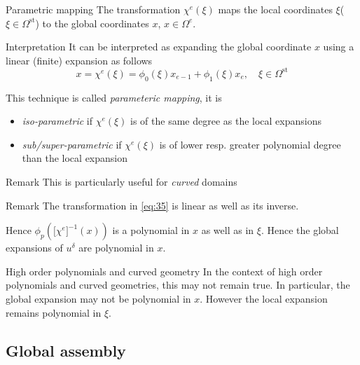 \begin{frame}{Parametric mapping}
  The transformation $\chi^e(\xi)$ maps the local coordinates
  $\xi$($\xi \in \Omega^{\text{st}}$) to the global coordinates $x$,
  $x \in \Omega^e$.
  
  \begin{block}{Interpretation}
    It can be interpreted as expanding the global coordinate $x$ using a linear (finite) expansion as follows
    \begin{equation}
      \label{eq:35}
      x = \chi^e(\xi) = \phi_0(\xi) x_{e-1} + \phi_1(\xi) x_e, \quad \xi \in \Omega^{\text{st}}
    \end{equation}
  \end{block}
  
  This technique is called \emph{parameteric mapping}, it is
  \begin{itemize}
  \item \emph{iso-parametric} if $\chi^e(\xi)$ is of the same degree as the local expansions
  \item \emph{sub/super-parametric} if $\chi^e(\xi)$ is of lower resp. greater polynomial degree than the local expansion
  \end{itemize}
  \begin{block}{Remark}
    This is particularly useful for \emph{curved} domains
  \end{block}
\end{frame}
\begin{frame}{Remark}
  The transformation in \eqref{eq:35} is linear as well as its inverse. 
  
  Hence $\phi_p(\Big[\chi^e\Big]^{-1} (x))$ is a polynomial in $x$ as
  well as in $\xi$. Hence the global expansions of $u^{\delta}$ are
  polynomial in $x$.

  \begin{alertblock}{High order polynomials and curved geometry}
    In the context of high order polynomials and curved geometries,
    this may not remain true. In particular, the global expansion may
    not be polynomial in $x$. However the local expansion remains
    polynomial in $\xi$.
  \end{alertblock}
\end{frame}


\subsection{Global assembly}
\label{sec:glonbal-assembly}

